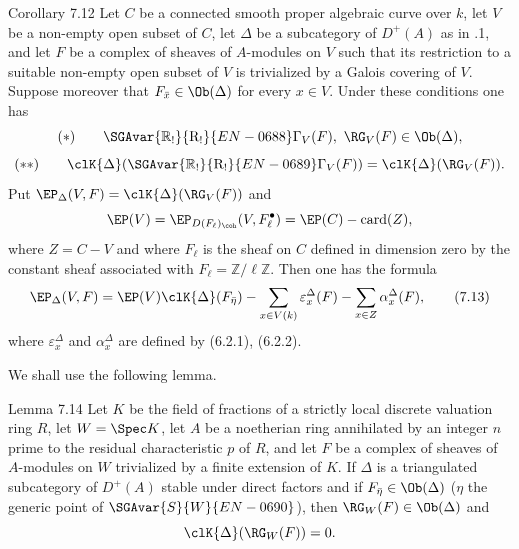 \begin{statement}{Corollary 7.12}
Let $C$ be a connected smooth proper algebraic curve over $k$, let $V$ be a non-empty open subset of $C$, let $\Delta$ be a subcategory of $D^+(A)$ as in .1, and let $F$ be a complex of sheaves of $A$-modules on $V$ such that its restriction to a suitable non-empty open subset of $V$ is trivialized by a Galois covering of $V$. Suppose moreover that $F_{\bar x}\in\Ob(\Delta)$ for every $x\in V$. Under these conditions one has
\[
(*)\qquad \SGAvar{\mathbb{R}_!}{\mathrm{R}_!}{EN-0688}\Gamma_V(F),\ \RG_V(F)\in\Ob(\Delta),
\]
\[
(**)\qquad
\clK{\Delta}(\SGAvar{\mathbb{R}_!}{\mathrm{R}_!}{EN-0689}\Gamma_V(F))=\clK{\Delta}(\RG_V(F)).
\]
Put $\EP_\Delta(V,F)=\clK{\Delta}(\RG_V(F))$ and
\[
\EP(V)=\EP_{D(F_\ell)_{\coh}}(V,F_\ell^\bullet)=\EP(C)-\operatorname{card}(Z),
\]
where $Z=C-V$ and where $F_\ell$ is the sheaf on $C$ defined in dimension zero by the constant sheaf associated with $F_\ell=\mathbb Z/\ell\mathbb Z$. Then one has the formula
\[
\EP_\Delta(V,F)
=
\EP(V)\clK{\Delta}(F_{\bar\eta})
-\sum_{x\in V(k)}\varepsilon_x^\Delta(F)
-\sum_{x\in Z}\alpha_x^\Delta(F),
\tag{7.13}
\]
where $\varepsilon_x^\Delta$ and $\alpha_x^\Delta$ are defined by (6.2.1), (6.2.2).
\end{statement}

We shall use the following lemma.

\begin{statement}{Lemma 7.14}
Let $K$ be the field of fractions of a strictly local discrete valuation ring $R$, let $W=\Spec K$, let $A$ be a noetherian ring annihilated by an integer $n$ prime to the residual characteristic $p$ of $R$, and let $F$ be a complex of sheaves of $A$-modules on $W$ trivialized by a finite extension of $K$. If $\Delta$ is a triangulated subcategory of $D^+(A)$ stable under direct factors and if $F_{\bar\eta}\in\Ob(\Delta)$ ($\eta$ the generic point of $\SGAvar{S}{W}{EN-0690}$), then $\RG_W(F)\in\Ob(\Delta)$ and
\[
\clK{\Delta}(\RG_W(F))=0.
\]
\end{statement}

